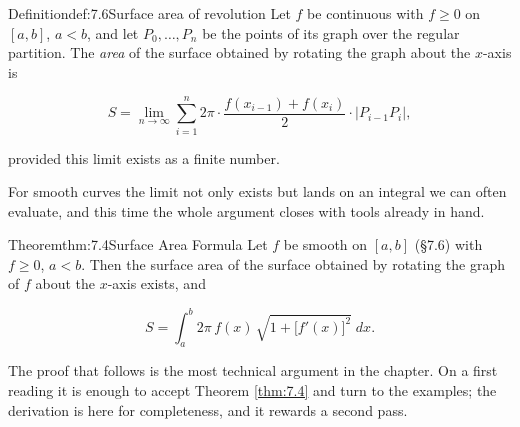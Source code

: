 \documentclass[a4paper,12pt,oneside]{memoir}
\begin{document}
\begin{envdefinition}{Definition}{def:7.6}{Surface area of revolution}
Let \(f\) be continuous with \(f \ge 0\) on \([a, b]\), \(a < b\), and let \(P_0, \dots, P_n\) be the points of its graph over the regular partition. The \emph{area} of the surface obtained by rotating the graph about the \(x\)-axis is

\[ S = \lim_{n \to \infty} \sum_{i=1}^{n} 2\pi\cdot\frac{f(x_{i-1}) + f(x_i)}{2}\cdot\bigl\lvert P_{i-1}P_i\bigr\rvert, \]

provided this limit exists as a finite number.
\end{envdefinition}
For smooth curves the limit not only exists but lands on an integral we can often evaluate, and this time the whole argument closes with tools already in hand.

\begin{envtheorem}{Theorem}{thm:7.4}{Surface Area Formula}
Let \(f\) be smooth on \([a, b]\) (§7.6) with \(f \ge 0\), \(a < b\). Then the surface area of the surface obtained by rotating the graph of \(f\) about the \(x\)-axis exists, and

\[ S = \int_{a}^{b} 2\pi\,f(x)\,\sqrt{1 + \bigl[f'(x)\bigr]^{2}}\;dx. \]
\end{envtheorem}
The proof that follows is the most technical argument in the chapter. On a first reading it is enough to accept Theorem \ref{thm:7.4} and turn to the examples; the derivation is here for completeness, and it rewards a second pass.
\end{document}
